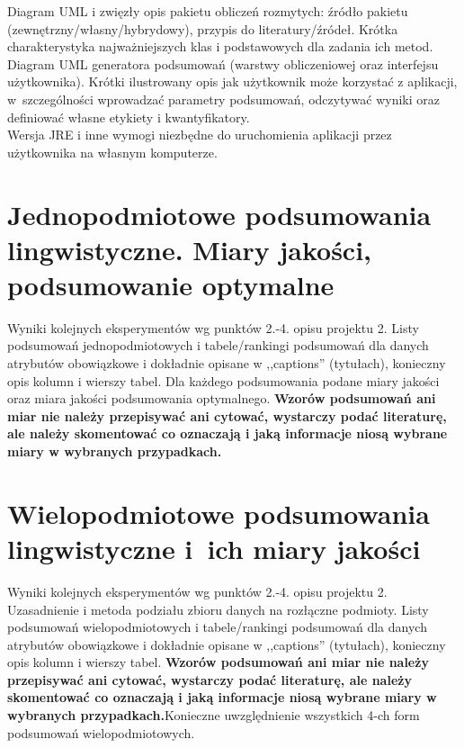 \documentclass{article}
\begin{document}
Diagram UML i zwięzły opis pakietu obliczeń rozmytych: źródło pakietu
(zewnętrzny/własny/hybrydowy), przypis do literatury/źródeł. Krótka charakterystyka
najważniejszych klas i podstawowych dla zadania ich metod. \\

Diagram UML generatora podsumowań (warstwy obliczeniowej oraz interfejsu
użytkownika). Krótki ilustrowany opis jak użytkownik może korzystać z aplikacji, w~szczególności
wprowadzać parametry  podsumowań, odczytywać wyniki oraz definiować własne etykiety i
kwantyfikatory.\\

Wersja JRE i inne wymogi niezbędne do uruchomienia aplikacji przez użytkownika na własnym komputerze. 

\section{ Jednopodmiotowe podsumowania lingwistyczne. Miary jakości, podsumowanie optymalne}
Wyniki kolejnych eksperymentów wg punktów 2.-4. opisu projektu 2.  Listy podsumowań
jednopodmiotowych i tabele/rankingi podsumowań dla danych atrybutów obowiązkowe i dokładnie opisane w ,,captions'' (tytułach), konieczny opis kolumn i wierszy tabel. Dla każdego podsumowania podane miary jakości oraz miara jakości podsumowania
optymalnego. {\bf Wzorów podsumowań ani miar nie należy przepisywać ani cytować, wystarczy podać literaturę, ale
należy skomentować co oznaczają i jaką informacje niosą wybrane miary w wybranych
przypadkach.}\\

\section{Wielopodmiotowe podsumowania lingwistyczne i~ich miary jakości} 
Wyniki kolejnych eksperymentów wg punktów 2.-4. opisu projektu 2. Uzasadnienie i
metoda podziału zbioru danych na rozłączne podmioty. Listy podsumowań
wielopodmiotowych i tabele/rankingi podsumowań dla danych atrybutów obowiązkowe i
dokładnie opisane w ,,captions'' (tytułach), konieczny opis kolumn i wierszy tabel.
{\bf Wzorów podsumowań ani miar nie należy przepisywać ani cytować, wystarczy podać literaturę, ale
należy skomentować co oznaczają i jaką informacje niosą wybrane miary w wybranych
przypadkach.}Konieczne uwzględnienie wszystkich 4-ch form podsumowań wielopodmiotowych. 
\\ 
\end{document}
